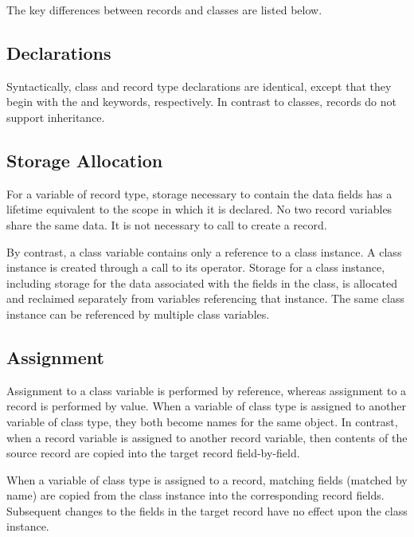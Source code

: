 The key differences between records and classes are listed below.

\subsection{Declarations}
\label{Declaration_Differences}

Syntactically, class and record type declarations are identical, except that
they begin with the  and  keywords, respectively.
In contrast to classes, records do not support inheritance.

\subsection{Storage Allocation}
\label{Storage_Allocation_Differences}

For a variable of record type, storage necessary to contain the data fields
has a lifetime equivalent to the scope in which it is declared.  No two record
variables share the same data.  It is not necessary to call  to create
a record.

By contrast, a class variable contains only a reference to a
class instance.  A class instance is created through a call to its 
operator.  Storage for a class instance, including storage for
the data associated with the fields in the class, is allocated and reclaimed
separately from variables referencing that instance.  The same class instance
can be referenced by multiple class variables.

\subsection{Assignment}
\label{Assignment_Differences}

Assignment to a class variable is performed by reference, whereas assignment to
a record is performed by value.  When a variable of class type is assigned to
another variable of class type, they both become names for the same object.  In
contrast, when a record variable is assigned to another record variable, then
contents of the source record are copied into the target record field-by-field.

When a variable of class type is assigned to a record, matching fields (matched
by name) are copied from the class instance into the corresponding record
fields.  Subsequent changes to the fields in the target record have no effect
upon the class instance.

